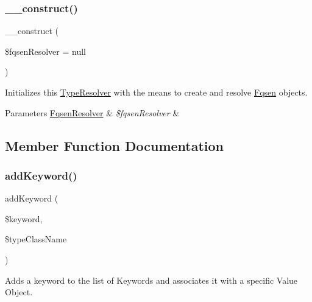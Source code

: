 \subsubsection{\texorpdfstring{\+\_\+\+\_\+construct()}{\_\_construct()}}
{\footnotesize\ttfamily \+\_\+\+\_\+construct (\begin{DoxyParamCaption}\item[{\mbox{\hyperlink{classphp_documentor_1_1_reflection_1_1_fqsen_resolver}{Fqsen\+Resolver}}}]{\$fqsen\+Resolver = {\ttfamily null} }\end{DoxyParamCaption})}

Initializes this \mbox{\hyperlink{classphp_documentor_1_1_reflection_1_1_type_resolver}{Type\+Resolver}} with the means to create and resolve \mbox{\hyperlink{classphp_documentor_1_1_reflection_1_1_fqsen}{Fqsen}} objects.


\begin{DoxyParams}[1]{Parameters}
\mbox{\hyperlink{classphp_documentor_1_1_reflection_1_1_fqsen_resolver}{Fqsen\+Resolver}} & {\em \$fqsen\+Resolver} & \\
\hline
\end{DoxyParams}


\subsection{Member Function Documentation}
\mbox{\label{classphp_documentor_1_1_reflection_1_1_type_resolver_ae6b1b230b7cdd893066228b4bff05fcd}} 
\subsubsection{\texorpdfstring{add\+Keyword()}{addKeyword()}}
{\footnotesize\ttfamily add\+Keyword (\begin{DoxyParamCaption}\item[{}]{\$keyword,  }\item[{}]{\$type\+Class\+Name }\end{DoxyParamCaption})}

Adds a keyword to the list of Keywords and associates it with a specific Value Object.


